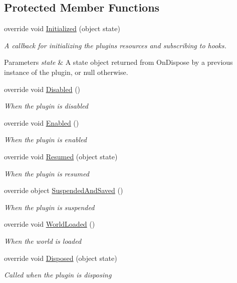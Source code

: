 \subsection*{Protected Member Functions}
\begin{DoxyCompactItemize}
\item 
override void \hyperlink{class_o_t_a_1_1_plugin_1_1_l_u_a_plugin_a3d4b13055c51eb0102570791a39ad342}{Initialized} (object state)
\begin{DoxyCompactList}\small\item\em A callback for initializing the plugin\textquotesingle{}s resources and subscribing to hooks. 
\begin{DoxyParams}{Parameters}
{\em state} & A state object returned from On\+Dispose by a previous instance of the plugin, or null otherwise. \\
\hline
\end{DoxyParams}
\end{DoxyCompactList}\item 
override void \hyperlink{class_o_t_a_1_1_plugin_1_1_l_u_a_plugin_a66f59d2f50de758a8ba6f313bbd7d34f}{Disabled} ()
\begin{DoxyCompactList}\small\item\em When the plugin is disabled \end{DoxyCompactList}\item 
override void \hyperlink{class_o_t_a_1_1_plugin_1_1_l_u_a_plugin_a83468512ba470c685c98bc97f0e4e3d0}{Enabled} ()
\begin{DoxyCompactList}\small\item\em When the plugin is enabled \end{DoxyCompactList}\item 
override void \hyperlink{class_o_t_a_1_1_plugin_1_1_l_u_a_plugin_ace1081e8469ea2eba5f1e34b0e4f8fcf}{Resumed} (object state)
\begin{DoxyCompactList}\small\item\em When the plugin is resumed \end{DoxyCompactList}\item 
override object \hyperlink{class_o_t_a_1_1_plugin_1_1_l_u_a_plugin_a1e83eee80339a1ef25f85fb7f669a118}{Suspended\+And\+Saved} ()
\begin{DoxyCompactList}\small\item\em When the plugin is suspended \end{DoxyCompactList}\item 
override void \hyperlink{class_o_t_a_1_1_plugin_1_1_l_u_a_plugin_a3b793a6fdc8bd554c10cbb59256b1499}{World\+Loaded} ()
\begin{DoxyCompactList}\small\item\em When the world is loaded \end{DoxyCompactList}\item 
override void \hyperlink{class_o_t_a_1_1_plugin_1_1_l_u_a_plugin_a43ac75f9664f8494c6546c9f945ce760}{Disposed} (object state)
\begin{DoxyCompactList}\small\item\em Called when the plugin is disposing \end{DoxyCompactList}\end{DoxyCompactItemize}
